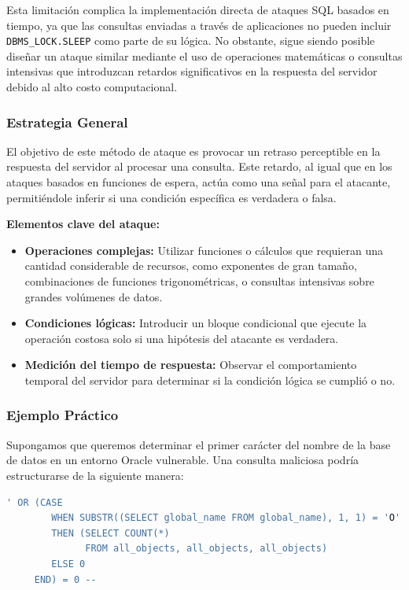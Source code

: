 \documentclass[a4paper,12pt]{article}
\begin{document}
Esta limitación complica la implementación directa de ataques SQL basados en tiempo, ya que las consultas enviadas a través de aplicaciones no pueden incluir \texttt{DBMS\_LOCK.SLEEP} como parte de su lógica. No obstante, sigue siendo posible diseñar un ataque similar mediante el uso de operaciones matemáticas o consultas intensivas que introduzcan retardos significativos en la respuesta del servidor debido al alto costo computacional.

\subsubsection{Estrategia General}

El objetivo de este método de ataque es provocar un retraso perceptible en la respuesta del servidor al procesar una consulta. Este retardo, al igual que en los ataques basados en funciones de espera, actúa como una señal para el atacante, permitiéndole inferir si una condición específica es verdadera o falsa.

\textbf{Elementos clave del ataque:}
\begin{itemize}
    \item \textbf{Operaciones complejas:} Utilizar funciones o cálculos que requieran una cantidad considerable de recursos, como exponentes de gran tamaño, combinaciones de funciones trigonométricas, o consultas intensivas sobre grandes volúmenes de datos.
    \item \textbf{Condiciones lógicas:} Introducir un bloque condicional que ejecute la operación costosa solo si una hipótesis del atacante es verdadera.
    \item \textbf{Medición del tiempo de respuesta:} Observar el comportamiento temporal del servidor para determinar si la condición lógica se cumplió o no.
\end{itemize}

\subsubsection{Ejemplo Práctico}

Supongamos que queremos determinar el primer carácter del nombre de la base de datos en un entorno Oracle vulnerable. Una consulta maliciosa podría estructurarse de la siguiente manera:

\begin{lstlisting}[language=SQL]
' OR (CASE 
        WHEN SUBSTR((SELECT global_name FROM global_name), 1, 1) = 'O' 
        THEN (SELECT COUNT(*) 
              FROM all_objects, all_objects, all_objects) 
        ELSE 0 
     END) = 0 --
\end{lstlisting}
\end{document}
